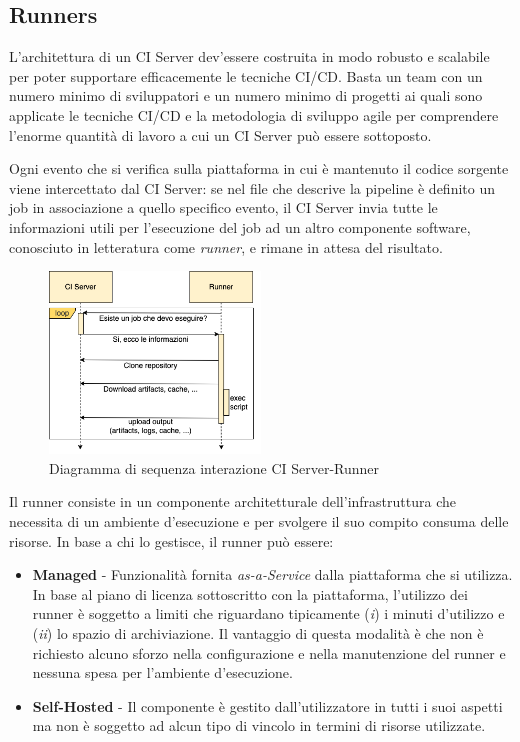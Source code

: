 \subsection{Runners}
L'architettura di un CI Server dev'essere costruita in modo robusto e scalabile per poter supportare efficacemente le tecniche CI/CD.
Basta un team con un numero minimo di sviluppatori e un numero minimo di progetti ai quali sono applicate le tecniche CI/CD e la metodologia di sviluppo agile per comprendere l'enorme quantità di lavoro a cui un CI Server può essere sottoposto.

Ogni evento che si verifica sulla piattaforma in cui è mantenuto il codice sorgente viene intercettato dal CI Server: 
se nel file che descrive la pipeline è definito un job in associazione a quello specifico evento, 
il CI Server invia tutte le informazioni utili per l'esecuzione del job ad un altro componente software, 
conosciuto in letteratura come \textit{runner}, 
e rimane in attesa del risultato.

\begin{figure}[H]
    \centering
    \includegraphics[width=0.5\textwidth]{img/ciserver-runner.png}
    \caption{Diagramma di sequenza interazione CI Server-Runner}
    \label{ci-server-runner}
\end{figure}

Il runner consiste in un componente architetturale dell'infrastruttura che necessita di un ambiente d'esecuzione e per svolgere il suo compito consuma delle risorse. 
In base a chi lo gestisce, il runner può essere:

\begin{itemize}
    \item \textbf{Managed} - Funzionalità fornita \textit{as-a-Service} dalla piattaforma che si utilizza. In base al piano di licenza sottoscritto con la piattaforma, l'utilizzo dei runner è soggetto a limiti che riguardano tipicamente (\textit{i}) i minuti d'utilizzo e (\textit{ii}) lo spazio di archiviazione. Il vantaggio di questa modalità è che non è richiesto alcuno sforzo nella configurazione e nella manutenzione del runner e nessuna spesa per l'ambiente d'esecuzione.
    
    \item \textbf{Self-Hosted} - Il componente è gestito dall'utilizzatore in tutti i suoi aspetti ma non è soggetto ad alcun tipo di vincolo in termini di risorse utilizzate.
\end{itemize}